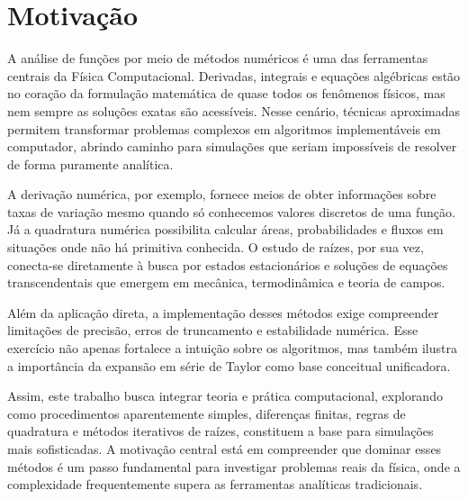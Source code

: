 \chapter*{Motivação}

A análise de funções por meio de métodos numéricos é uma das ferramentas centrais da Física Computacional. 
Derivadas, integrais e equações algébricas estão no coração da formulação matemática de quase todos os fenômenos físicos, 
mas nem sempre as soluções exatas são acessíveis. Nesse cenário, técnicas aproximadas permitem transformar problemas complexos 
em algoritmos implementáveis em computador, abrindo caminho para simulações que seriam impossíveis de resolver de forma puramente analítica.

A derivação numérica, por exemplo, fornece meios de obter informações sobre taxas de variação mesmo quando só conhecemos valores discretos 
de uma função. Já a quadratura numérica possibilita calcular áreas, probabilidades e fluxos em situações onde não há primitiva conhecida. 
O estudo de raízes, por sua vez, conecta-se diretamente à busca por estados estacionários e soluções de equações transcendentais que emergem 
em mecânica, termodinâmica e teoria de campos.

Além da aplicação direta, a implementação desses métodos exige compreender limitações de precisão, erros de truncamento e estabilidade numérica. 
Esse exercício não apenas fortalece a intuição sobre os algoritmos, mas também ilustra a importância da expansão em série de Taylor como base 
conceitual unificadora.

Assim, este trabalho busca integrar teoria e prática computacional, explorando como procedimentos aparentemente simples, diferenças finitas, 
regras de quadratura e métodos iterativos de raízes, constituem a base para simulações mais sofisticadas. A motivação central está em compreender 
que dominar esses métodos é um passo fundamental para investigar problemas reais da física, onde a complexidade frequentemente supera as ferramentas 
analíticas tradicionais.
